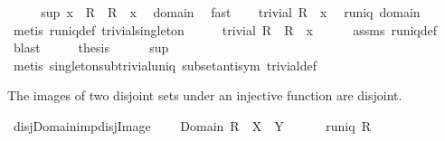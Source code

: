 \begin{isabellebody}
%
\isadelimproof
%
\endisadelimproof
%
\isatagproof
{}\isamarkupfalse%
\ {\isacharminus}\isanewline
\ \ \isamarkupfalse%
\ sup{\isacharcolon}\ {\isachardoublequoteopen}{\isacharbraceleft}x{\isacharbraceright}\ {\isasymsubseteq}\ R{\isasyminverse}\ {\isacharbackquote}{\isacharbackquote}\ R\ {\isacharbackquote}{\isacharbackquote}\ {\isacharbraceleft}x{\isacharbraceright}{\isachardoublequoteclose}\ \isamarkupfalse%
\ domain\ \isamarkupfalse%
\ fast\isanewline
\ \ \isamarkupfalse%
\ {\isachardoublequoteopen}trivial\ {\isacharparenleft}R\ {\isacharbackquote}{\isacharbackquote}\ {\isacharbraceleft}x{\isacharbraceright}{\isacharparenright}{\isachardoublequoteclose}\ \isamarkupfalse%
\ runiq\ domain\ \isamarkupfalse%
\ {\isacharparenleft}metis\ runiq{\isacharunderscore}def\ trivial{\isacharunderscore}singleton{\isacharparenright}\isanewline
\ \ \isamarkupfalse%
\ \isamarkupfalse%
\ {\isachardoublequoteopen}trivial\ {\isacharparenleft}R{\isasyminverse}\ {\isacharbackquote}{\isacharbackquote}\ R\ {\isacharbackquote}{\isacharbackquote}\ {\isacharbraceleft}x{\isacharbraceright}{\isacharparenright}{\isachardoublequoteclose}\isanewline
\ \ \ \ \isamarkupfalse%
\ assms\ runiq{\isacharunderscore}def\ \isamarkupfalse%
\ blast\isanewline
\ \ \isamarkupfalse%
\ \isamarkupfalse%
\ {\isacharquery}thesis\isanewline
\ \ \ \ \isamarkupfalse%
\ sup\ \isamarkupfalse%
\ {\isacharparenleft}metis\ singleton{\isacharunderscore}sub{\isacharunderscore}trivial{\isacharunderscore}uniq\ subset{\isacharunderscore}antisym\ trivial{\isacharunderscore}def{\isacharparenright}\isanewline
{}\isamarkupfalse%
%
\endisatagproof
{\isafoldproof}%
%
\isadelimproof
%
\endisadelimproof
%
\begin{isamarkuptext}%
The images of two disjoint sets under an injective function are disjoint.%
\end{isamarkuptext}%
\isamarkuptrue%
\isamarkupfalse%
\ disj{\isacharunderscore}Domain{\isacharunderscore}imp{\isacharunderscore}disj{\isacharunderscore}Image{\isacharcolon}\ \isanewline
\ \ \ {\isachardoublequoteopen}Domain\ R\ {\isasyminter}\ X\ {\isasyminter}\ Y\ {\isacharequal}\ {\isacharbraceleft}{\isacharbraceright}{\isachardoublequoteclose}\ \isanewline
\ \ \ {\isachardoublequoteopen}runiq\ R{\isachardoublequoteclose}\isanewline

\end{isabellebody}

